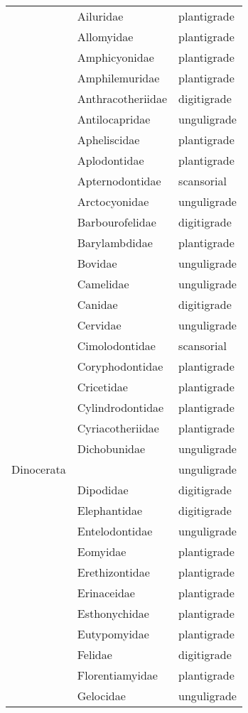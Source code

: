 \begin{center}
\begin{longtable}{ l l l }
    & Ailuridae & plantigrade \\ 
    & Allomyidae & plantigrade \\ 
    & Amphicyonidae & plantigrade \\ 
    & Amphilemuridae & plantigrade \\ 
    & Anthracotheriidae & digitigrade \\ 
    & Antilocapridae & unguligrade \\ 
    & Apheliscidae & plantigrade \\ 
    & Aplodontidae & plantigrade \\ 
    & Apternodontidae & scansorial \\ 
    & Arctocyonidae & unguligrade \\ 
    & Barbourofelidae & digitigrade \\ 
    & Barylambdidae & plantigrade \\ 
    & Bovidae & unguligrade \\ 
    & Camelidae & unguligrade \\ 
    & Canidae & digitigrade \\ 
    & Cervidae & unguligrade \\ 
    & Cimolodontidae & scansorial \\ 
    & Coryphodontidae & plantigrade \\ 
    & Cricetidae & plantigrade \\ 
    & Cylindrodontidae & plantigrade \\ 
    & Cyriacotheriidae & plantigrade \\ 
    & Dichobunidae & unguligrade \\ 
    Dinocerata &  & unguligrade \\ 
    & Dipodidae & digitigrade \\ 
    & Elephantidae & digitigrade \\ 
    & Entelodontidae & unguligrade \\ 
    & Eomyidae & plantigrade \\ 
    & Erethizontidae & plantigrade \\ 
    & Erinaceidae & plantigrade \\ 
    & Esthonychidae & plantigrade \\ 
    & Eutypomyidae & plantigrade \\ 
    & Felidae & digitigrade \\ 
    & Florentiamyidae & plantigrade \\ 
    & Gelocidae & unguligrade \\ 

\end{longtable}
\end{center}
